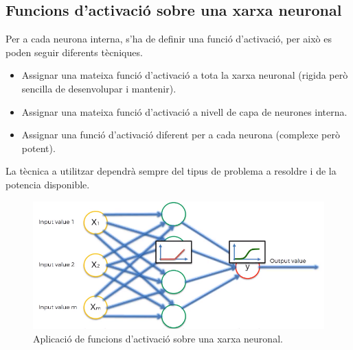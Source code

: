 \documentclass[12pt]{article}
\begin{document}
\subsection{Funcions d'activació sobre una xarxa neuronal}
Per a cada neurona interna, s'ha de definir una funció d'activació, per això es poden seguir diferents tècniques.
\begin{itemize}
	\item Assignar una mateixa funció d'activació a tota la xarxa neuronal (rigida però sencilla de desenvolupar i mantenir).
	\item Assignar una mateixa funció d'activació a nivell de capa de neurones interna.
	\item Assignar una funció d'activació diferent per a cada neurona (complexe però potent).
\end{itemize}
La tècnica a utilitzar dependrà sempre del tipus de problema a resoldre i de la potencia disponible.
\begin{figure}[h!]
	\centering
	\includegraphics[scale=0.3]{imatges/fa/5complet.png}
	\caption{Aplicació de funcions d'activació sobre una xarxa neuronal.}
\end{figure}



\clearpage
\end{document}
